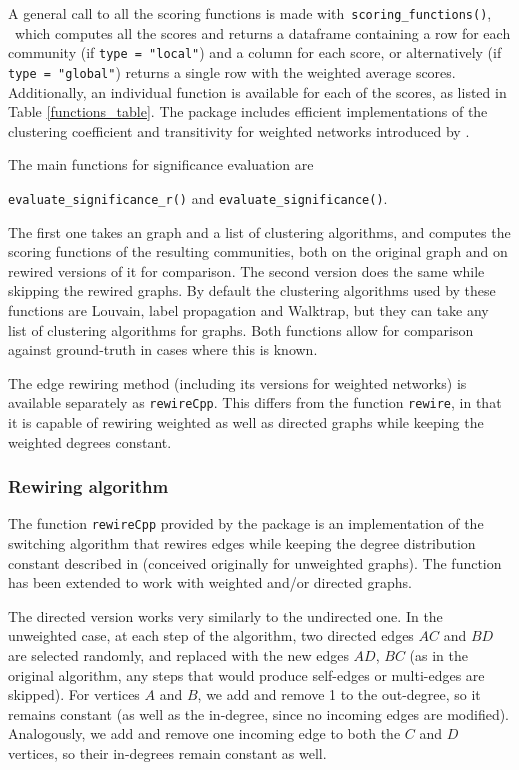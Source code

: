 A general call to all the scoring functions is made with\
\texttt{scoring\_functions()}, \ 
which computes all the scores and returns a dataframe containing   a row for each community (if \texttt{type = "local"}) and a column for each score, or alternatively (if \texttt{type = "global"}) returns a single row with the weighted average scores. Additionally, an individual function is available for each of the scores, as listed in Table \ref{functions_table}.
The package includes efficient implementations of the clustering coefficient and transitivity for weighted networks introduced by \cite{clustcoeficient}.

The main functions for significance evaluation are\\
\centerline{\texttt{evaluate\_significance\_r()}
and
\texttt{evaluate\_significance()}.}

The first one takes an  graph and a list of clustering algorithms, and computes the scoring functions of the resulting communities, both on the original graph and on rewired versions of it for comparison.  The second version does the same while skipping the rewired graphs. 
By default the clustering algorithms used by these functions are Louvain, label propagation and Walktrap, but they can take any list of clustering algorithms for  graphs.
Both  functions allow for comparison against ground-truth in cases where this is known.

The edge rewiring method (including its versions for weighted networks) is available separately as \texttt{rewireCpp}. This differs from the  function \texttt{rewire}, in that it is capable of rewiring weighted as well as directed graphs  while keeping the weighted degrees constant.

\subsubsection{Rewiring algorithm}\label{switching_model}
The function \texttt{rewireCpp} provided by the package is an implementation of the switching algorithm that rewires edges while keeping the degree distribution constant described in \citep{switchingmodel,matrix_switching_model} (conceived originally for unweighted graphs). The function has been extended to work with weighted and/or directed graphs.

The directed version works very similarly to the undirected one. 
In the unweighted case, at each step of the algorithm, two directed edges $AC$ and $BD$ are selected randomly, and replaced with the new edges $AD$, $BC$ (as in the original algorithm, any steps that would produce self-edges or multi-edges are skipped). For vertices $A$ and $B$, we add and remove 1 to the out-degree, so it remains constant (as well as the in-degree, since no incoming edges are modified). Analogously, we add and remove one incoming edge to both the $C$ and $D$ vertices, so their in-degrees remain constant as well.


